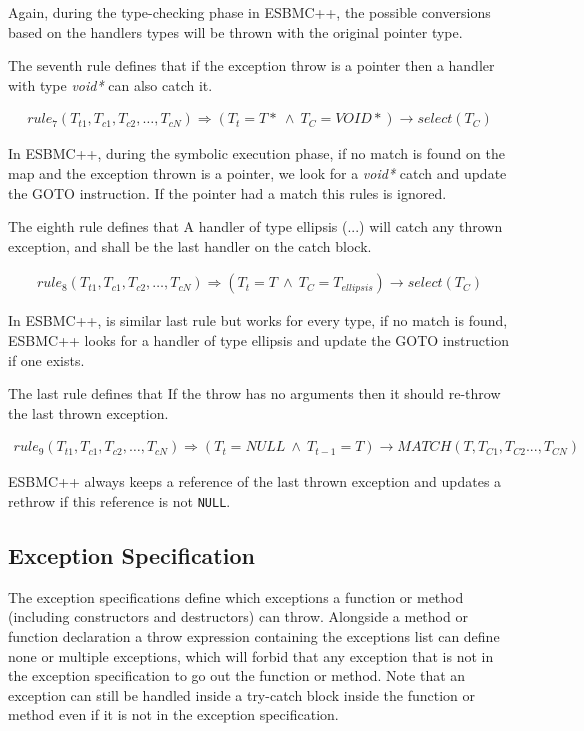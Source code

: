 \documentclass[a4paper]{llncs}
\begin{document}
Again, during the type-checking phase in ESBMC++, the possible conversions based
on the handlers types will be thrown with the original pointer type.

The seventh rule defines that if the exception throw is a pointer then
a handler with type \textit{void*} can also catch it.

\[\begin{array}{ll}
rule_7(T_{t1},T_{c1}, T_{c2}, \ldots, T_{cN}) \Longrightarrow
  (T_{t} = T* \: \wedge \: T_{C} = VOID*)\rightarrow select(T_{C})
\end{array}\]

In ESBMC++, during the symbolic execution phase, if no match is found on the map
and the exception thrown is a pointer, we look for a \textit{void*} catch and update
the GOTO instruction. If the pointer had a match this rules is ignored.

The eighth rule defines that A handler of type ellipsis (...) will catch
any thrown exception, and shall be the last handler on the catch block.

\[\begin{array}{ll}
rule_8(T_{t1},T_{c1}, T_{c2}, \ldots, T_{cN}) \Longrightarrow
  (T_{t} = T \: \wedge \: T_{C} = T_{ellipsis})\rightarrow select(T_{C})
\end{array}\]

In ESBMC++, is similar last rule but works for every type,
if no match is found, ESBMC++ looks for a handler of type ellipsis and
update the GOTO instruction if one exists.

The last rule defines that If the throw has no arguments then it should
re-throw the last thrown exception.

\[\begin{array}{ll}
rule_9(T_{t1},T_{c1}, T_{c2}, \ldots, T_{cN}) \Longrightarrow
  (T_{t} = NULL \: \wedge \: T_{t-1} = T)\rightarrow MATCH(T,T_{C1}, T_{C2}... , T_{CN})
\end{array}\]

ESBMC++ always keeps a reference of the last thrown exception and
updates a rethrow if this reference is not \verb|NULL|.


\subsection{Exception Specification}

The exception specifications define which exceptions a
function or method (including constructors
and destructors) can throw. Alongside a method or
function declaration a throw expression containing
the exceptions list can define none or
multiple exceptions, which will forbid that
any exception that is not in the exception
specification to go out the function or method. Note
that an exception can still be handled inside
a try-catch block inside the function or method
even if it is not in the exception specification.
\end{document}
